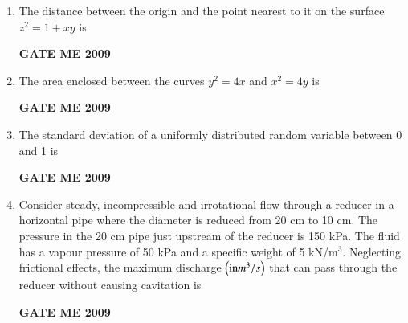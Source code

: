 \documentclass[journal]{IEEEtran}
\begin{document}
\begin{enumerate}[leftmargin=0pt]
\item The distance between the origin and the point nearest to it on the surface $z^2 = 1+xy$ is
\begin{enumerate}
\hfill{\textbf{GATE ME 2009}}
\end{enumerate}

\item The area enclosed between the curves $y^2 = 4x$ and $x^2 = 4y$ is
\begin{enumerate}
\hfill{\textbf{GATE ME 2009}}
\end{enumerate}

\item The standard deviation of a uniformly distributed random variable between 0 and 1 is
\begin{enumerate}
\hfill{\textbf{GATE ME 2009}}
\end{enumerate}

\item Consider steady, incompressible and irrotational flow through a reducer in a horizontal pipe where the diameter is reduced from 20 cm to 10 cm. The pressure in the 20 cm pipe just upstream of the reducer is 150 kPa. The fluid has a vapour pressure of 50 kPa and a specific weight of 5 kN/m$^3$. Neglecting frictional effects, the maximum discharge $\left(\text{in} m^3/s\right)$ that can pass through the reducer without causing cavitation is
\begin{enumerate}
\hfill{\textbf{GATE ME 2009}}
\end{enumerate}


\end{enumerate}
\end{document}

